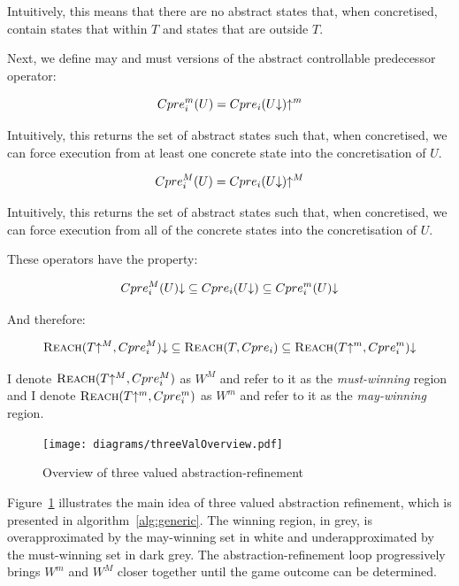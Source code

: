 Intuitively, this means that there are no abstract states that, when concretised, contain states that within $T$ and states that are outside $T$.

Next, we define may and must versions of the abstract controllable predecessor operator:

\begin{equation}
    Cpre_i^m(U) = Cpre_i(U\mathord{\downarrow})\mathord{\uparrow^m}
    \label{eqn:def_cpre_m}
\end{equation}

Intuitively, this returns the set of abstract states such that, when concretised, we can force execution from at least one concrete state into the concretisation of $U$.

\begin{equation}
    Cpre_i^M(U) = Cpre_i(U\mathord{\downarrow})\mathord{\uparrow^M}
    \label{eqn:def_cpre_M}
\end{equation}

Intuitively, this returns the set of abstract states such that, when concretised, we can force execution from all of the concrete states into the concretisation of $U$.

These operators have the property:

\begin{equation}
Cpre_i^M(U)\mathord{\downarrow} \subseteq Cpre_i(U\mathord{\downarrow}) \subseteq Cpre_i^m(U)\mathord{\downarrow}
\end{equation}

And therefore:

\begin{equation}
\label{eqn:cpre_inclusion}
\textsc{Reach}(T\mathord{\uparrow^M}, Cpre_i^M)\mathord{\downarrow} \subseteq \textsc{Reach}(T, Cpre_i) \subseteq \textsc{Reach}(T\mathord{\uparrow^m}, Cpre_i^m)\mathord{\downarrow}
\end{equation}

I denote $\textsc{Reach}(T\mathord{\uparrow^M}, Cpre_i^M)$ as $W^M$ and refer to it as the \emph{must-winning} region and I denote $\textsc{Reach}(T\mathord{\uparrow^m}, Cpre_i^m)$ as $W^m$ and refer to it as the \emph{may-winning} region.

\begin{figure}[t]
\centering
\texttt{[image: diagrams/threeValOverview.pdf]}
\caption{Overview of three valued abstraction-refinement}
\label{fig:three_val_overview}
\end{figure}

Figure~\ref{fig:three_val_overview} illustrates the main idea of three valued abstraction refinement, which is presented in algorithm~\ref{alg:generic}. The winning region, in grey, is overapproximated by the may-winning set in white and underapproximated by the must-winning set in dark grey. The abstraction-refinement loop progressively brings $W^m$ and $W^M$ closer together until the game outcome can be determined.

